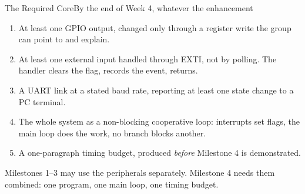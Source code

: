 \documentclass[9pt,aspectratio=169,xcolor=table]{beamer}
\begin{document}
\begin{frame}{The Required Core}{By the end of Week 4, whatever the enhancement}
    \begin{enumerate}\itemsep3pt
        \item At least one \alert{GPIO output}, changed only through a register write the group can point to and explain.
        \item At least one external input handled through \alert{EXTI}, not by polling. The handler clears the flag, records the event, returns.
        \item A \alert{UART link} at a stated baud rate, reporting at least one state change to a PC terminal.
        \item The whole system as a \alert{non-blocking cooperative loop}: interrupts set flags, the main loop does the work, no branch blocks another.
        \item A one-paragraph \alert{timing budget}, produced \emph{before} Milestone 4 is demonstrated.
    \end{enumerate}

    \vspace{3mm}
    {\small Milestones 1--3 may use the peripherals separately. Milestone 4 needs them combined: one program, one main loop, one timing budget.}
\end{frame}
\end{document}
